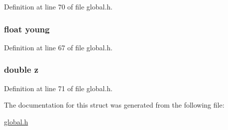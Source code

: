 Definition at line 70 of file global.\-h.

\hypertarget{structcellData_ad0bd87a264e65d1c17ecc07049819f2c}{
\subsubsection[{young}]{\setlength{\rightskip}{0pt plus 5cm}float young}}\label{structcellData_ad0bd87a264e65d1c17ecc07049819f2c}


Definition at line 67 of file global.\-h.

\hypertarget{structcellData_ab3e6ed577a7c669c19de1f9c1b46c872}{
\subsubsection[{z}]{\setlength{\rightskip}{0pt plus 5cm}double z}}\label{structcellData_ab3e6ed577a7c669c19de1f9c1b46c872}


Definition at line 71 of file global.\-h.



The documentation for this struct was generated from the following file\-:\begin{DoxyCompactItemize}
\item 
\hyperlink{global_8h}{global.\-h}\end{DoxyCompactItemize}
